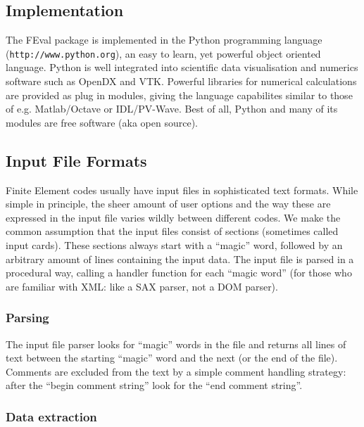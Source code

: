 \subsection{Implementation}
\label{sec:implementation}

The FEval package is implemented in the Python programming language
(\texttt{http://www.python.org}), an easy to learn, yet powerful object
oriented language.  Python is well integrated into scientific data
visualisation and numerics software such as OpenDX and VTK.  Powerful
libraries for numerical calculations are provided as plug in modules, giving
the language capabilites similar to those of e.g. Matlab/Octave or
IDL/PV-Wave. Best of all, Python and many of its modules are free software
(aka open source).

\subsection{Input File Formats}
\label{sec:input-file-formats}

Finite Element codes usually have input files in sophisticated text formats.
While simple in principle, the sheer amount of user options and the way these
are expressed in the input file varies wildly between different codes. We make
the common assumption that the input files consist of sections (sometimes
called input cards). These sections always start with a ``magic'' word,
followed by an arbitrary amount of lines containing the input data.  The input
file is parsed in a procedural way, calling a handler function for each
``magic word'' (for those who are familiar with XML: like a SAX parser, not a
DOM parser).

\subsubsection{Parsing}
\label{sec:input-file-parsing}

The input file parser looks for ``magic'' words in the file and returns all
lines of text between the starting ``magic'' word and the next (or the end of
the file). Comments are excluded from the text by a simple comment handling
strategy: after the ``begin comment string'' look for the ``end comment
string''.

\subsubsection{Data extraction}
\label{sec:data-extraction}

